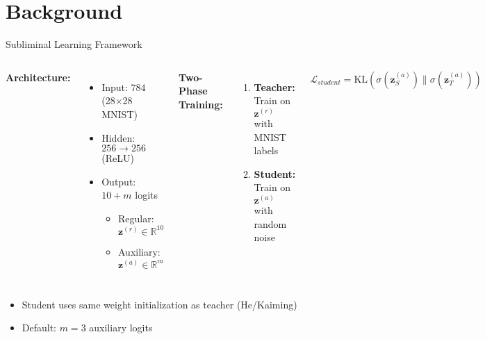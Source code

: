 \documentclass{beamer}
\begin{document}
\section{Background}

\begin{frame}{Subliminal Learning Framework}

\begin{columns}
\textbf{Architecture:}
\begin{itemize}
    \item Input: $784$ (28×28 MNIST)
    \item Hidden: $256 \to 256$ (ReLU)
    \item Output: $10 + m$ logits
    \begin{itemize}
        \item Regular: $\mathbf{z}^{(r)} \in \mathbb{R}^{10}$
        \item Auxiliary: $\mathbf{z}^{(a)} \in \mathbb{R}^{m}$
    \end{itemize}
\end{itemize}

\textbf{Two-Phase Training:}
\begin{enumerate}
    \item \textbf{Teacher:} Train on $\mathbf{z}^{(r)}$ with MNIST labels
    \item \textbf{Student:} Train on $\mathbf{z}^{(a)}$ with random noise
\end{enumerate}

\vspace{1em}

\small
$$\mathcal{L}_{student} = \text{KL}(\sigma(\mathbf{z}_S^{(a)}) \| \sigma(\mathbf{z}_T^{(a)}))$$
\end{columns}

\vspace{1em}

\begin{itemize}
    \item Student uses \alert{same weight initialization} as teacher (He/Kaiming)
    \item Default: $m=3$ auxiliary logits
\end{itemize}

\end{frame}
\end{document}
